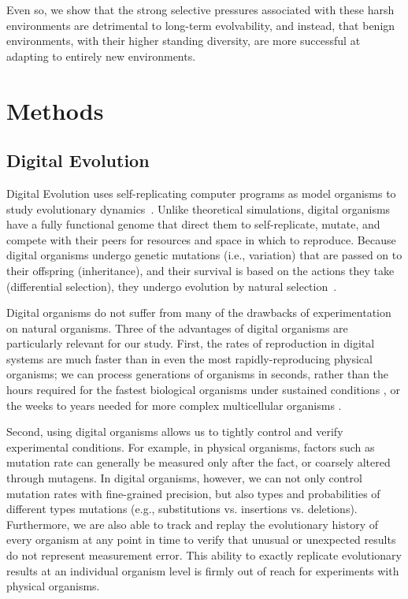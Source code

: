 \documentclass[10pt,letterpaper]{article}
\begin{document}
Even so, we show that the strong selective pressures associated with these harsh environments are detrimental to long-term evolvability, and instead, that benign environments, with their higher standing diversity, are more successful at adapting to entirely new environments.


\section*{Methods}

\subsection*{Digital Evolution}
Digital Evolution uses self-replicating computer programs as model organisms to study evolutionary dynamics~\cite{mckinley_harnessing_2008}. Unlike theoretical simulations, digital organisms have a fully functional genome that direct them to self-replicate, mutate, and compete with their peers for resources and space in which to reproduce. Because digital organisms undergo genetic mutations (i.e., variation) that are passed on to their offspring (inheritance), and their survival is based on the actions they take (differential selection), they undergo evolution by natural selection~\cite{dennett_darwins_1995}.

Digital organisms do not suffer from many of the drawbacks of experimentation on natural organisms.  Three of the advantages of digital organisms are particularly relevant for our study.  First, the rates of reproduction in digital systems are much faster than in even the most rapidly-reproducing physical organisms; we can process generations of organisms in seconds, rather than the hours required for the fastest biological organisms under sustained conditions \cite{ryan_evolution_1953,lenski_long-term_1991}, or the weeks to years needed for more complex multicellular organisms \cite{anderson_outcrossing_2010,stearns_experimental_2000}.

Second, using digital organisms allows us to tightly control and verify experimental conditions. For example, in physical organisms, factors such as mutation rate can generally be measured only after the fact, or coarsely altered through mutagens. In digital organisms, however, we can not only control mutation rates with fine-grained precision, but also types and probabilities of different types mutations (e.g., substitutions vs. insertions vs. deletions). Furthermore, we are also able to track and replay the evolutionary history of every organism at any point in time to verify that unusual or unexpected results do not represent measurement error. This ability to exactly replicate evolutionary results at an individual organism level is firmly out of reach for experiments with physical organisms.
\end{document}
